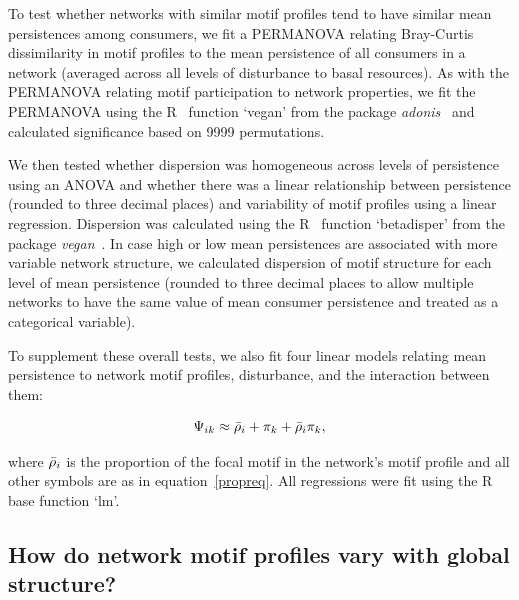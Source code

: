 \documentclass[12pt]{article}
\begin{document}
\begin{spacing}{2.0}
        To test whether networks with similar motif profiles tend to have similar mean persistences among consumers, we fit a PERMANOVA relating Bray-Curtis dissimilarity in motif profiles to the mean persistence of all consumers in a network (averaged across all levels of disturbance to basal resources).
        As with the PERMANOVA relating motif participation to network properties, we fit the PERMANOVA using the R~\citep{R} function `vegan' from the package \emph{adonis}~\citep{adonis} and calculated significance based on 9999 permutations.


        We then tested whether dispersion was homogeneous across levels of persistence using an ANOVA and whether there was a linear relationship between persistence (rounded to three decimal places) and variability of motif profiles using a linear regression.
        Dispersion was calculated using the R~\citep{R} function `betadisper' from the package \emph{vegan}~\citep{vegan}.
        In case high or low mean persistences are associated with more variable network structure, we calculated dispersion of motif structure for each level of mean persistence (rounded to three decimal places to allow multiple networks to have the same value of mean consumer persistence and treated as a categorical variable). 

        
        To supplement these overall tests, we also fit four linear models relating mean persistence to network motif profiles, disturbance, and the interaction between them:

            \begin{equation}
                \Psi_{ik} \approx \Bar{\rho}_{i} + \pi_{k} + \Bar{\rho}_{i}\pi_{k} ,
                \label{netpropeq}
            \end{equation}
        
        where $\Bar{\rho}_{i}$ is the proportion of the focal motif in the network's motif profile and all other symbols are as in equation~\ref{propreq}. 
        All regressions were fit using the R~\citep{R} base function `lm'.
    

    \subsection{How do network motif profiles vary with global structure?}
    

\end{spacing}
\end{document}
